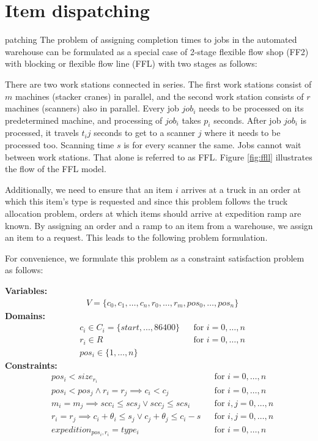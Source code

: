 \documentclass{ctuthesis}
\begin{document}
\section{Item dispatching}
\label{sec:expeditiondispatching}
\label{sec:jobdi}patching
The problem of assigning completion times to jobs in the automated warehouse can be formulated as a special case of 2-stage flexible flow shop (FF2) with blocking or flexible flow line (FFL) with two stages as follows:

There are two work stations connected in series. The first work stations consist of $m$ machines (stacker cranes) in parallel, and the second work station consists of $r$ machines (scanners) also in parallel. Every job $job_i$ needs to be processed on its predetermined machine, and processing of $job_i$ takes $p_i$ seconds. After job $job_i$ is processed, it travels $t_ij$ seconds to get to a scanner $j$ where it needs to be processed too. Scanning time $s$ is for every scanner the same. Jobs cannot wait between work stations. That alone is referred to as FFL. Figure \ref{fig:ffll} illustrates the flow of the FFL model.

Additionally, we need to ensure that an item $i$ arrives at a truck in an order at which this item's type is requested and since this problem follows the truck allocation problem, orders at which items should arrive at expedition ramp are known. By assigning an order and a ramp to an item from a warehouse, we assign an item to a request. This leads to the following problem formulation.

For convenience, we formulate this problem as a constraint satisfaction problem as follows:

\textbf{Variables:}
\begin{align}
    &V = \{c_{0}, c_{1}, \ldots, c_{n},r_0, \ldots, r_m, pos_0, \ldots, pos_n\}
\end{align}
\textbf{Domains:}
\begin{align}
&c_{i} \in C_i = \{start, ..., 86400\} && \text{for } i=0,\ldots,n\\
&r_{i} \in R && \text{for } i=0,\ldots,n\\
&pos_i \in \{1, \ldots, n\}
\end{align}
\textbf{Constraints:}
 \begin{align}
& pos_i < size_{r_i} && \text{for } i=0,\ldots,n \nonumber \\
& pos_i < pos_j \land r_i = r_j \implies c_i < c_j && \text{for } i=0,\ldots,n\\ \label{eq:idcons1}
& m_i = m_j \implies scc_i \leq scs_j \lor scc_j \leq scs_i && \text{for } i,j=0,\ldots,n\\ \label{eq:idcons2}
& r_i = r_j \implies c_i  + \theta_i \leq s_j \lor c_j + \theta_j \leq c_i - s && \text{for } i,j=0,\ldots,n\\ \label{eq:idcons3}
& expedition_{pos_i,r_i} = type_i  && \text{for } i=0,\ldots,n\\ \label{eq:idcons4}
\end{align}
\end{document}
